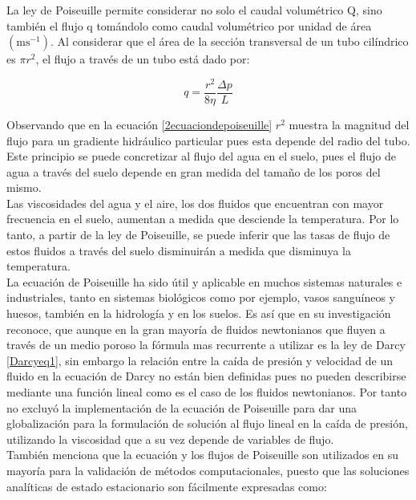 La ley de Poiseuille permite considerar no solo el caudal volumétrico $\mathrm{Q}$, sino también el flujo $\mathrm{q}$ tomándolo como caudal volumétrico por unidad de área $\left(\mathrm{ms}^{-1}\right)$. Al considerar que el área de la sección transversal de un tubo cilíndrico es $\pi r^{2}$, el flujo a través de un tubo está dado por:

\begin{equation}
	\label{2ecuaciondepoiseuille}
	q=\frac{r^{2}}{8 \eta} \frac{\Delta p}{L}
\end{equation}

Observando que en la ecuación \eqref{2ecuaciondepoiseuille} $r^2$ muestra la magnitud del flujo para un gradiente hidráulico particular pues esta depende del radio del tubo. Este principio se puede concretizar al flujo del agua en el suelo,  pues el flujo de agua a través del suelo depende en gran medida del tamaño de los poros del mismo.\\

Las viscosidades del agua y el aire, los dos fluidos que encuentran con mayor frecuencia en el suelo, aumentan a medida que desciende la temperatura. Por lo tanto, a partir de la ley de Poiseuille, se puede inferir que las tasas de flujo de estos fluidos a través del suelo disminuirán a medida que disminuya la temperatura.\\


La ecuación de Poiseuille ha sido útil y aplicable en muchos sistemas naturales e industriales, tanto en sistemas biológicos como por ejemplo, vasos sanguíneos y huesos, también en la hidrología y en los suelos. Es así que \parencite{Eberhard2019} 
en su investigación reconoce, que aunque en la gran mayoría de fluidos newtonianos que fluyen a través de un medio poroso la fórmula mas recurrente a utilizar es la ley de Darcy \eqref{Darcyeq1}, sin embargo la relación entre la caída de presión y velocidad de un fluido en la ecuación de Darcy no están bien definidas  pues no pueden describirse mediante una función lineal como es el caso de los fluidos newtonianos. Por tanto \parencite{Eberhard2019} no excluyó la  implementación de la ecuación de Poiseuille para dar una globalización para la formulación de solución al flujo lineal en la caída de presión, utilizando la viscosidad que a su vez depende de variables de flujo.\\

También \parencite{Xenakis2015} menciona que la ecuación y los flujos de Poiseuille son utilizados en su mayoría para la validación de métodos computacionales, puesto que las soluciones analíticas de estado estacionario son fácilmente expresadas como:

